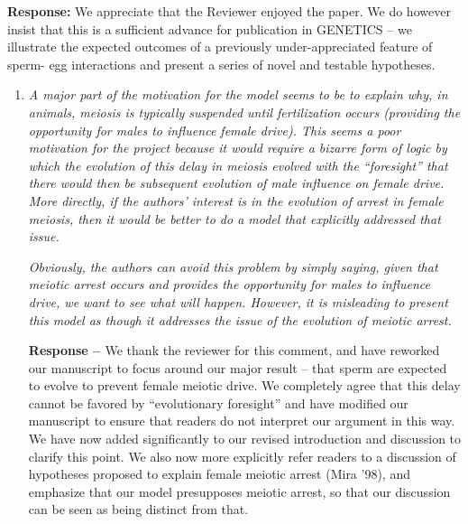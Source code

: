 \documentclass[12pt,letterpaper]{article}
\newcommand{\gc}[1]{{ \color{red} #1}}
\begin{document}
{\bf{Response:}} We appreciate that the Reviewer enjoyed the paper. 
We do however insist that this is a sufficient advance for publication in GENETICS --
 we illustrate the expected outcomes of a previously under-appreciated feature of sperm-
 egg interactions and present a series of novel and testable hypotheses. 
\begin{enumerate}
\item
\begin{singlespace}
\emph{A major part of the motivation for the model seems to be to explain why, in
animals, meiosis is typically suspended until fertilization occurs (providing
the opportunity for males to influence female drive).  This seems a poor
motivation for the project because it would require a bizarre form of logic by
which the evolution of this delay in meiosis evolved with the ``foresight'' that
there would then be subsequent evolution of male influence on female drive. 
More directly, if the authors' interest is in the evolution of arrest in female
meiosis, then it would be better to do a model that explicitly addressed that
issue.  }

\emph{Obviously, the authors can avoid this problem by simply saying, given that
meiotic arrest occurs and provides the opportunity for males to influence drive,
we want to see what will happen.  However, it is misleading to present this
model as though it addresses the issue of the evolution of meiotic arrest.}
\end{singlespace}

\begin{singlespace}
{\bf{Response -- }} We thank the reviewer for this comment, and have reworked our manuscript to focus 
	around our major result -- that sperm are expected to evolve to prevent female meiotic drive. 
	We completely agree that this delay cannot be favored by ``evolutionary foresight'' and have 
	modified our manuscript to ensure that readers do not
        interpret our argument in this way. We have now added
          significantly to our  revised introduction and discussion to
          clarify this point. 	
We also now more explicitly refer readers to a discussion of
        hypotheses proposed to explain female meiotic arrest (Mira
        '98), and emphasize that our model presupposes meiotic arrest, 
        so that our discussion can be seen as being distinct from that. 


%	
\end{singlespace}


\end{enumerate}
\end{document}
